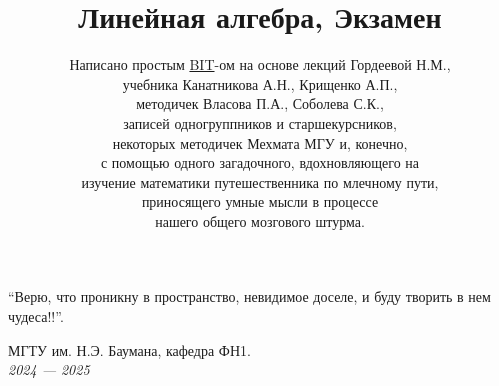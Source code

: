 \documentclass[a4papper]{article}
\title{\Huge Линейная алгебра, Экзамен}
\author{
    Написано простым \href{https://t.me/Borislav_Timoshin}{BIT}-ом на основе лекций Гордеевой Н.М., \\ 
    учебника Канатникова А.Н., Крищенко А.П., \\
    методичек Власова П.А., Соболева С.К., \\
    записей одногруппников и старшекурсников,\\ некоторых методичек Мехмата МГУ и, конечно, \\ с помощью одного загадочного, вдохновляющего на \\ изучение математики путешественника по млечному пути, \\
    приносящего умные мысли в процессе \\
    нашего общего мозгового штурма. 
}
\date{} %
\begin{document}
    \pagestyle{fancy}
    \fancyhead[L]{\thepage}

    \maketitle

    \epigraph{
        ``Верю, что проникну в пространство, невидимое доселе, и буду творить в нем чудеса!!''.
    }{}


    \vfill %

    \begin{center}
        \Large МГТУ им. Н.Э. Баумана, кафедра ФН1. \\
        \emph{2024 — 2025}
    \end{center}

    \newpage
        
    \tableofcontents

    
    
    
    
    
    
    
    
    
    
    
    
    
    
    
    
    
    
    
    

    
    
    
    
    
    
    
    
    
    
    
    
    
    
    
    
    
    
    
    
\end{document}
